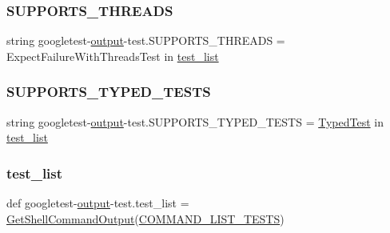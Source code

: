 \mbox{\label{namespacegoogletest-output-test_a9dd8b32109121ee9ce8a8c42130ca621}} 
\subsubsection{\texorpdfstring{SUPPORTS\_THREADS}{SUPPORTS\_THREADS}}
{\footnotesize\ttfamily string googletest-\/\mbox{\hyperlink{namespacegoogletest-output-test_ab3df9ce09186215a36c30454cf282417}{output}}-\/test.\+S\+U\+P\+P\+O\+R\+T\+S\+\_\+\+T\+H\+R\+E\+A\+DS = \textquotesingle{}Expect\+Failure\+With\+Threads\+Test\textquotesingle{} in \mbox{\hyperlink{namespacegoogletest-output-test_aa116be76cb5d1da2469f2811706bf08e}{test\+\_\+list}}}

\mbox{\label{namespacegoogletest-output-test_a20362e86a65972b4ca1d030daabb0485}} 
\subsubsection{\texorpdfstring{SUPPORTS\_TYPED\_TESTS}{SUPPORTS\_TYPED\_TESTS}}
{\footnotesize\ttfamily string googletest-\/\mbox{\hyperlink{namespacegoogletest-output-test_ab3df9ce09186215a36c30454cf282417}{output}}-\/test.\+S\+U\+P\+P\+O\+R\+T\+S\+\_\+\+T\+Y\+P\+E\+D\+\_\+\+T\+E\+S\+TS = \textquotesingle{}\mbox{\hyperlink{classTypedTest}{Typed\+Test}}\textquotesingle{} in \mbox{\hyperlink{namespacegoogletest-output-test_aa116be76cb5d1da2469f2811706bf08e}{test\+\_\+list}}}

\mbox{\label{namespacegoogletest-output-test_aa116be76cb5d1da2469f2811706bf08e}} 
\subsubsection{\texorpdfstring{test\_list}{test\_list}}
{\footnotesize\ttfamily def googletest-\/\mbox{\hyperlink{namespacegoogletest-output-test_ab3df9ce09186215a36c30454cf282417}{output}}-\/test.\+test\+\_\+list = \mbox{\hyperlink{namespacegoogletest-output-test_aba640d7d1d0c51624f079baff79a04ab}{Get\+Shell\+Command\+Output}}(\mbox{\hyperlink{namespacegoogletest-output-test_accb05a0a5c9b083723186bb6116f928f}{C\+O\+M\+M\+A\+N\+D\+\_\+\+L\+I\+S\+T\+\_\+\+T\+E\+S\+TS}})}

